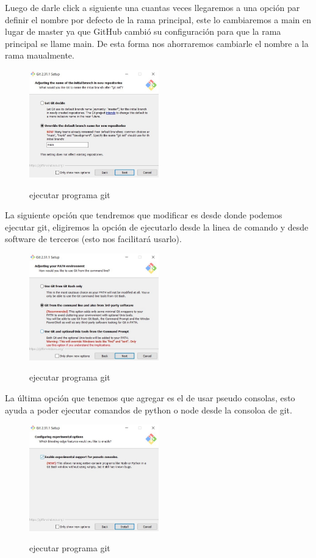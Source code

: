 \documentclass[11pt, oneside]{article}
\begin{document}
Luego de darle click a siguiente una cuantas veces llegaremos a una opción par definir el nombre por defecto de la rama principal, este lo cambiaremos a main en lugar de master ya que GitHub cambió su configuración para que la rama principal se llame main. De esta forma nos ahorraremos cambiarle el nombre a la rama maualmente.

\begin{figure}[H]
  \centering
  \caption{ejecutar programa git}
  \includegraphics[width=0.50\textwidth]{./img/win/ins-win-3.jpeg}
  \label{fig:git-ins-3}
\end{figure}

La siguiente opción que tendremos que modificar es desde donde podemos ejecutar git, eligiremos la opción de ejecutarlo desde la linea de comando y desde software de terceros (esto nos facilitará usarlo).

\begin{figure}[H]
  \centering
  \caption{ejecutar programa git}
  \includegraphics[width=0.50\textwidth]{./img/win/ins-win-4.jpeg}
  \label{fig:git-ins-4}
\end{figure}

La última opción que tenemos que agregar es el de usar pseudo consolas, esto ayuda a poder ejecutar comandos de python o node desde la consoloa de git.

\begin{figure}[H]
  \centering
  \caption{ejecutar programa git}
  \includegraphics[width=0.50\textwidth]{./img/win/ins-win-5.jpeg}
  \label{fig:git-ins-5}
\end{figure}
\end{document}
